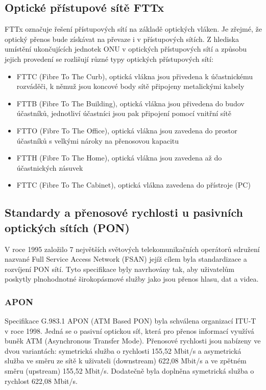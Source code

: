 \subsection{Optické přístupové sítě FTTx}
FTTx označuje řešení přístupových sítí na základě optických vláken. Je zřejmé, že optický přenos bude získávat na převaze i v přístupových sítích. Z hlediska umístění ukončujících jednotek ONU v optických přístupových sítí a způsobu jejich provedení se rozlišují různé typy optických přístupových sítí:
\begin{itemize}
    \item FTTC (Fibre To The Curb), optická vlákna jsou přivedena k účastnickému rozváděči, k němuž jsou koncové body sítě připojeny metalickými kabely
    \item FTTB (Fibre To The Building), optická vlákna jsou přivedena do budov účastníků, jednotliví účastníci jsou pak připojení pomocí vnitřní sítě
    \item FTTO (Fibre To The Office), optická vlákna jsou zavedena do prostor účastníků s velkými nároky na přenosovou kapacitu
    \item FTTH (Fibre To The Home), optická vlákna jsou zavedena až do účastnických zásuvek
    \item FTTC (Fibre To The Cabinet), optická vlákna zavedena do přístroje (PC)
\end{itemize}

\subsection{Standardy a přenosové rychlosti u pasivních optických sítích (PON)}
V roce 1995 založilo 7 největších světových telekomunikačních operátorů sdružení nazvané Full Service Access Network (FSAN) jejíž cílem byla standardizace a rozvíjení PON sítí. Tyto specifikace byly navrhovány tak, aby uživatelům poskytly plnohodnotné širokopásmové služby jako jsou přenos hlasu, dat a videa.

\subsubsection{APON}
Specifikace G.983.1 APON (ATM Based PON) byla schválena organizací ITU-T v roce 1998. Jedná se o pasivní optickou síť, která pro přenos informací využívá buněk ATM (Asynchronous Transfer Mode). Přenosové rychlosti jsou nabízeny ve dvou variantách: symetrická služba o rychlosti 155,52 Mbit/s a asymetrická služba ve směru ze sítě k uživateli (downstream) 622,08 Mbit/s a ve zpětném směru (upstream) 155,52 Mbit/s. Dodatečně byla doplněna symetrická služba o rychlost 622,08 Mbit/s.

